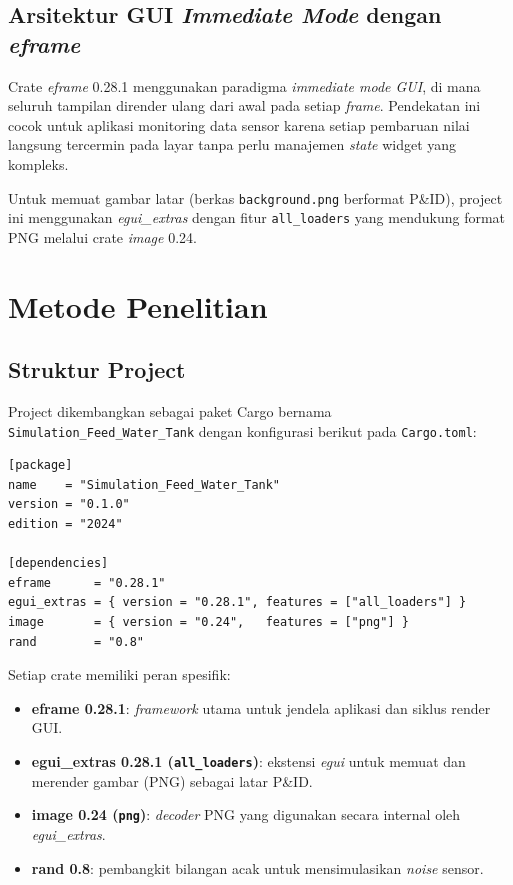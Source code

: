 \documentclass[12pt,a4paper]{article}
\begin{document}
\subsection{Arsitektur GUI \textit{Immediate Mode} dengan \textit{eframe}}
Crate \textit{eframe} 0.28.1 menggunakan paradigma \textit{immediate mode
GUI}, di mana seluruh tampilan dirender ulang dari awal pada setiap
\textit{frame}. Pendekatan ini cocok untuk aplikasi monitoring data sensor
karena setiap pembaruan nilai langsung tercermin pada layar tanpa perlu
manajemen \textit{state} widget yang kompleks.

Untuk memuat gambar latar (berkas \texttt{background.png} berformat P\&ID),
project ini menggunakan \textit{egui\_extras} dengan fitur
\texttt{all\_loaders} yang mendukung format PNG melalui crate
\textit{image} 0.24.

\section{Metode Penelitian}

\subsection{Struktur Project}
Project dikembangkan sebagai paket Cargo bernama
\texttt{Simulation\_Feed\_Water\_Tank} dengan konfigurasi berikut pada
\texttt{Cargo.toml}:

\begin{lstlisting}[language={},caption={Konfigurasi Cargo.toml}]
[package]
name    = "Simulation_Feed_Water_Tank"
version = "0.1.0"
edition = "2024"

[dependencies]
eframe      = "0.28.1"
egui_extras = { version = "0.28.1", features = ["all_loaders"] }
image       = { version = "0.24",   features = ["png"] }
rand        = "0.8"
\end{lstlisting}

Setiap crate memiliki peran spesifik:
\begin{itemize}
    \item \textbf{eframe 0.28.1}: \textit{framework} utama untuk jendela
          aplikasi dan siklus render GUI.
    \item \textbf{egui\_extras 0.28.1 (\texttt{all\_loaders})}: ekstensi
          \textit{egui} untuk memuat dan merender gambar (PNG) sebagai
          latar P\&ID.
    \item \textbf{image 0.24 (\texttt{png})}: \textit{decoder} PNG yang
          digunakan secara internal oleh \textit{egui\_extras}.
    \item \textbf{rand 0.8}: pembangkit bilangan acak untuk mensimulasikan
          \textit{noise} sensor.
\end{itemize}
\end{document}
